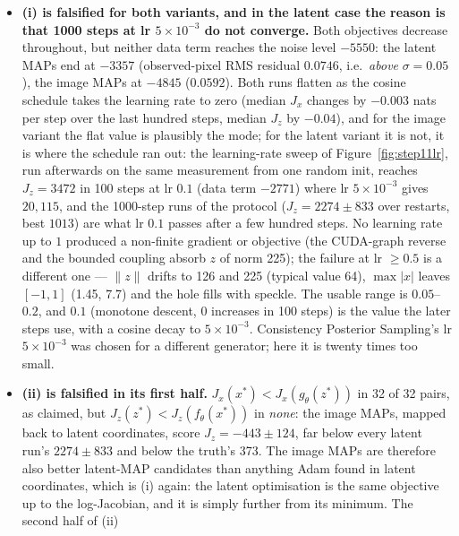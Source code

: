\documentclass[11pt]{article}
\begin{document}
\begin{itemize}
  \item \textbf{(i) is falsified for both variants, and in the latent case
        the reason is that 1000 steps at lr $5 \times 10^{-3}$ do not
        converge.} Both objectives decrease throughout, but neither data
        term reaches the noise level $-5550$: the latent MAPs end at
        $-3357$ (observed-pixel RMS residual $0.0746$, i.e.\ \emph{above}
        $\sigma = 0.05$), the image MAPs at $-4845$ ($0.0592$). Both runs
        flatten as the cosine schedule takes the learning rate to zero
        (median $J_x$ changes by $-0.003$ nats per step over the last
        hundred steps, median $J_z$ by $-0.04$), and for the image variant
        the flat value is plausibly the mode; for the latent variant it is
        not, it is where the schedule ran out: the learning-rate
        sweep of Figure~\ref{fig:step11lr}, run afterwards on the same
        measurement from one random init, reaches $J_z = 3472$ in 100 steps
        at lr $0.1$ (data term $-2771$) where lr $5 \times 10^{-3}$ gives
        $20{,}115$, and the 1000-step runs of the protocol ($J_z = 2274 \pm
        833$ over restarts, best $1013$) are what lr $0.1$ passes after a
        few hundred steps. No learning rate up to $1$ produced a non-finite
        gradient or objective (the CUDA-graph reverse and the bounded
        coupling absorb $z$ of norm 225); the failure at lr $\geq 0.5$ is a
        different one --- $\|z\|$ drifts to 126 and 225 (typical value 64),
        $\max|x|$ leaves $[-1,1]$ (1.45, 7.7) and the hole fills with
        speckle. The usable range is $0.05$--$0.2$, and $0.1$ (monotone
        descent, 0 increases in 100 steps) is the value the later steps
        use, with a cosine decay to $5 \times 10^{-3}$. Consistency Posterior
        Sampling's lr $5 \times 10^{-3}$ was chosen for a different
        generator; here it is twenty times too small.
  \item \textbf{(ii) is falsified in its first half.} $J_x(x^{*}) <
        J_x(g_\theta(z^{*}))$ in 32 of 32 pairs, as claimed, but
        $J_z(z^{*}) < J_z(f_\theta(x^{*}))$ in \emph{none}: the image MAPs,
        mapped back to latent coordinates, score $J_z = -443 \pm 124$, far
        below every latent run's $2274 \pm 833$ and below the truth's 373.
        The image MAPs are therefore also better latent-MAP candidates than
        anything Adam found in latent coordinates, which is (i) again: the
        latent optimisation is the same objective up to the log-Jacobian,
        and it is simply further from its minimum. The second half of (ii)

\end{itemize}
\end{document}
